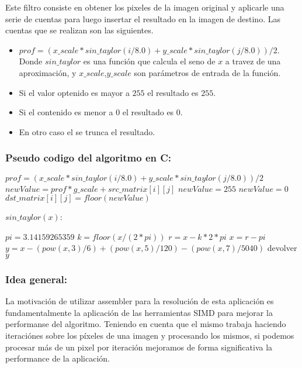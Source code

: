 Este filtro consiste en obtener los pixeles de la imagen original y aplicarle una serie de cuentas para luego insertar el resultado en la imagen de destino. Las cuentas que se realizan son las siguientes. \\

\begin{itemize}
	\item $prof = ( x\_scale*sin\_taylor(i/8.0) + y\_scale*sin\_taylor(j/8.0) )/2$. Donde $sin\_taylor$ es una función que calcula el seno de $x$ a travez de una aproximación, y $x\_scale$,$y\_scale$ son parámetros de entrada de la función.
	\item Si el valor optenido es mayor a $255$ el resultado es $255$.
	\item Si el contenido es menor a $0$ el resultado es $0$.
	\item En otro caso el se trunca el resultado.
\end{itemize}

\subsubsection{Pseudo codigo del algoritmo en C:}

\begin{pseudocodigo}
			\STATE
			\STATE $prof = ( x\_scale*sin\_taylor(i/8.0) + y\_scale*sin\_taylor(j/8.0) )/2$ 
			\STATE $newValue = prof*g\_scale + src\_matrix[i][j]$ 
			\STATE
				\STATE $newValue = 255$
			\ELSE 
					\STATE $newValue = 0$
				\ENDIF 
			\ENDIF
			\STATE $dst\_matrix[i][j] = floor(newValue)$ 
		\ENDFOR
	\ENDFOR
\end{pseudocodigo}

$sin\_taylor(x)$:


\begin{pseudocodigo}
			\STATE
			\STATE $pi	= 3.14159265359$
			\STATE $k 			= floor(x/(2*pi))$
			\STATE $r 		= x - k*2*pi$
			\STATE $x 				= r - pi$
			\STATE $y 		= x - (pow(x,3)/6) + (pow(x,5)/120) - (pow(x,7)/5040)$
			\STATE
			\STATE devolver $y$
			\STATE
		\ENDFOR
	\ENDFOR
\end{pseudocodigo}

\subsubsection{Idea general:}
La motivación de utilizar assembler para la resolución de esta aplicación es fundamentalmente la aplicación de las herramientas SIMD para mejorar la performanse del algoritmo. Teniendo en cuenta que el mismo trabaja haciendo iteraciónes sobre los píxeles de una imagen y procesando los mismos, si podemos procesar más de un pixel por iteración mejoramos de forma significativa la performance de la aplicación.\\

